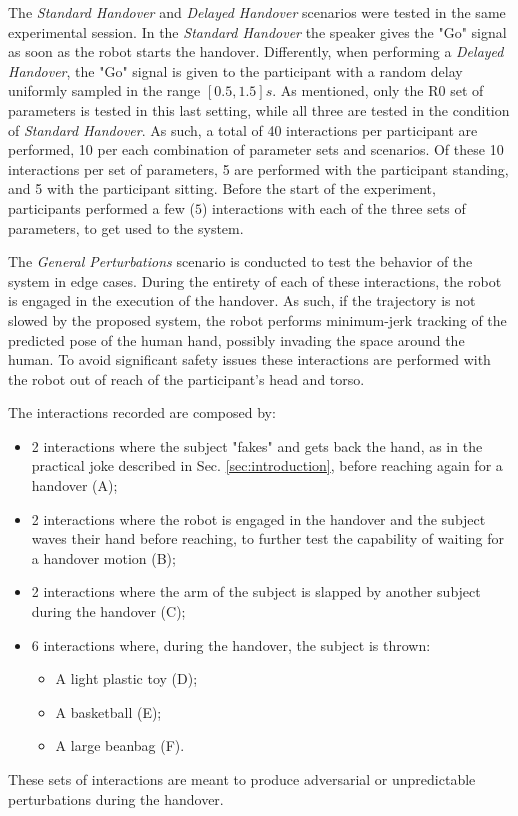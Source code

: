 \documentclass[lettersize,journal]{IEEEtran}
\begin{document}
The \textit{Standard Handover} and \textit{Delayed Handover} scenarios were tested in the same experimental session.
In the \textit{Standard Handover} the speaker gives the "Go" signal as soon as the robot starts the handover.
Differently, when performing a \textit{Delayed Handover}, the "Go" signal is given to the participant with a random delay uniformly sampled in the range $[0.5, 1.5]s$. 
As mentioned, only the R0 set of parameters is tested in this last setting, while all three are tested in the condition of \textit{Standard Handover}.
As such, a total of 40 interactions per participant are performed, 10 per each combination of parameter sets and scenarios.
Of these 10 interactions per set of parameters, 5 are performed with the participant standing, and 5 with the participant sitting.
Before the start of the experiment, participants performed a few ($5$) interactions with each of the three sets of parameters, to get used to the system.

The \textit{General Perturbations} scenario is conducted to test the behavior of the system in edge cases.
During the entirety of each of these interactions, the robot is engaged in the execution of the handover.
As such, if the trajectory is not slowed by the proposed system, the robot performs minimum-jerk tracking of the predicted pose of the human hand, possibly invading the space around the human.
To avoid significant safety issues these interactions are performed with the robot out of reach of the participant's head and torso.

The interactions recorded are composed by:
\begin{itemize}
    \item 2 interactions where the subject "fakes" and gets back the hand, as in the practical joke described in Sec. \ref{sec:introduction}, before reaching again for a handover (A); 
    \item 2 interactions where the robot is engaged in the handover and the subject waves their hand before reaching, to further test the capability of waiting for a handover motion (B);
    \item 2 interactions where the arm of the subject is slapped by another subject during the handover (C);
    \item 6 interactions where, during the handover, the subject is thrown:
    \begin{itemize}
        \item A light plastic toy (D);
        \item A basketball (E);
        \item A large beanbag (F).
    \end{itemize}
\end{itemize}
These sets of interactions are meant to produce adversarial or unpredictable perturbations during the handover.
\end{document}
